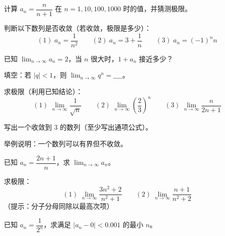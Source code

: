 
\begin{exercise}[1]
计算 \(a_n = \dfrac{n}{n+1}\) 在 \(n=1, 10, 100, 1000\) 时的值，并猜测极限。
\end{exercise}

\begin{exercise}[1]
判断以下数列是否收敛（若收敛，极限是多少）：
\[
(1)\; a_n = \frac{1}{n^2} \qquad
(2)\; a_n = 3 + \frac{1}{n} \qquad
(3)\; a_n = (-1)^n n
\]
\end{exercise}

\begin{exercise}[1]
已知 \(\displaystyle\lim_{n\to\infty} a_n = 2\)，当 \(n\) 很大时，\(1 + a_n\) 接近多少？
\end{exercise}

\begin{exercise}[1]
填空：若 \(|q| < 1\)，则 \(\displaystyle\lim_{n\to\infty} q^n = \_\_\_\_\)。
\end{exercise}


\begin{exercise}[2]
求极限（利用已知结论）：
\[
(1)\; \lim_{n\to\infty} \frac{1}{\sqrt{n}} \qquad
(2)\; \lim_{n\to\infty} \left(\frac{2}{3}\right)^n \qquad
(3)\; \lim_{n\to\infty} \frac{n}{2n+1}
\]
\end{exercise}

\begin{exercise}[2]
写出一个收敛到 3 的数列（至少写出通项公式）。
\end{exercise}

\begin{exercise}[2]
举例说明：一个数列可以有界但不收敛。
\end{exercise}

\begin{exercise}[2]
已知 \(a_n = \dfrac{2n+1}{n}\)，求 \(\displaystyle\lim_{n\to\infty} a_n\)。
\end{exercise}


\begin{exercise}[3]
求极限：
\[
(1)\; \lim_{n\to\infty} \frac{3n^2 + 2}{n^2 + 1} \qquad
(2)\; \lim_{n\to\infty} \frac{n + 1}{n^2 + 2}
\]
（提示：分子分母同除以最高次项）
\end{exercise}

\begin{exercise}[3]
已知 \(a_n = \dfrac{1}{2^n}\)，求满足 \(|a_n - 0| < 0.001\) 的最小 \(n\)。
\end{exercise}

